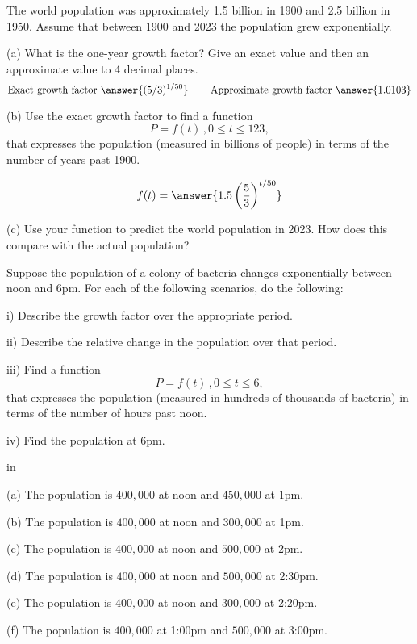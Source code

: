 \documentclass{ximera}
\newcommand{\pskip}{\vskip 0.1 in}
\begin{document}
\begin{question}   \label{Q6:ExponentialG}
The world population was approximately 1.5 billion in 1900 and 2.5 billion in 1950. Assume that between 1900 and 2023 the population grew exponentially.

(a) What is the one-year growth factor? Give an exact value and then an approximate value to 4 decimal places.
\[
   \text{Exact growth factor }  \answer{(5/3)^{1/50}} \hskip 0.3 in  \text{Approximate growth factor } \answer{1.0103}
\]

(b) Use the exact growth factor to find a function
\[
     P = f(t) \, , 0\leq t \leq 123 ,
\]
that expresses the population (measured in billions of people) in terms of the number of years past 1900.

\[
   f(t) = \answer{1.5 \left(\frac{5}{3}\right)^{t/50}}
\]

(c) Use your function to predict the world population in 2023. How does this compare with the actual population?

\end{question}






\begin{example}
Suppose the population of a colony of bacteria changes exponentially between noon and 6pm. For each of the following scenarios, do the following:

i) Describe the growth factor over the appropriate period.

ii) Describe the relative change in the population over that period.

iii) Find a function
\[
       P = f(t) \, , 0\leq t \leq 6 ,
\]
that expresses the population (measured in hundreds of thousands of bacteria) in terms of the number of hours past noon.

iv) Find the population at 6pm.

\pskip

(a) The population is $400,000$ at noon and $450,000$ at 1pm.

(b) The population is $400,000$ at noon and $300,000$ at 1pm.

(c) The population is $400,000$ at noon and $500,000$ at 2pm.

(d) The population is $400,000$ at noon and $500,000$ at 2:30pm.

(e)  The population is $400,000$ at noon and $300,000$ at 2:20pm.

(f)  The population is $400,000$ at 1:00pm and $500,000$ at 3:00pm.

\end{example}
\end{document}

